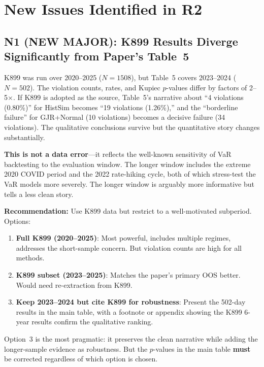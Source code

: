 \documentclass[12pt,a4paper]{article}
\begin{document}
\section*{New Issues Identified in R2}

\subsection*{\textcolor{warncolor}{N1 (NEW MAJOR): K899 Results Diverge Significantly from Paper's Table~5}}

K899 was run over 2020--2025 ($N = 1508$), but Table~5 covers 2023--2024 ($N = 502$). The violation counts, rates, and Kupiec $p$-values differ by factors of 2--5$\times$. If K899 is adopted as the source, Table~5's narrative about ``4 violations (0.80\%)'' for HistSim becomes ``19 violations (1.26\%),'' and the ``borderline failure'' for GJR+Normal (10 violations) becomes a decisive failure (34 violations). The qualitative conclusions survive but the quantitative story changes substantially.

\textbf{This is not a data error}---it reflects the well-known sensitivity of VaR backtesting to the evaluation window. The longer window includes the extreme 2020 COVID period and the 2022 rate-hiking cycle, both of which stress-test the VaR models more severely. The longer window is arguably more informative but tells a less clean story.

\textbf{Recommendation:} Use K899 data but restrict to a well-motivated subperiod. Options:
\begin{enumerate}[nosep]
\item \textbf{Full K899 (2020--2025)}: Most powerful, includes multiple regimes, addresses the short-sample concern. But violation counts are high for all methods.
\item \textbf{K899 subset (2023--2025)}: Matches the paper's primary OOS better. Would need re-extraction from K899.
\item \textbf{Keep 2023--2024 but cite K899 for robustness}: Present the 502-day results in the main table, with a footnote or appendix showing the K899 6-year results confirm the qualitative ranking.
\end{enumerate}

Option~3 is the most pragmatic: it preserves the clean narrative while adding the longer-sample evidence as robustness. But the $p$-values in the main table \textbf{must} be corrected regardless of which option is chosen.
\end{document}
